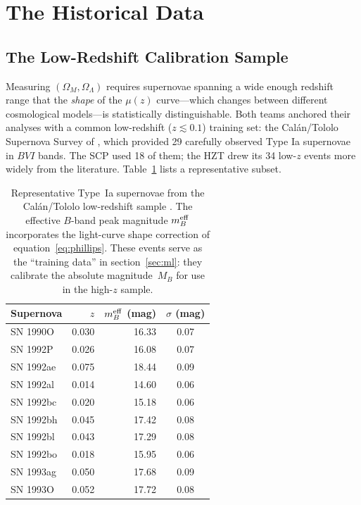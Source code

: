 \documentclass[12pt]{article}
\begin{document}
\section{The Historical Data}
\label{sec:data}

\subsection{The Low-Redshift Calibration Sample}

Measuring $(\Omega_M,\Omega_\Lambda)$ requires supernovae spanning a
wide enough redshift range that the \emph{shape} of the $\mu(z)$
curve---which changes between different cosmological models---is
statistically distinguishable.  Both teams anchored their analyses with
a common low-redshift ($z \lesssim 0.1$) training set: the
Cal\'an/Tololo Supernova Survey of \citet{Hamuy1996}, which provided 29
carefully observed Type Ia supernovae in $BVI$ bands.  The SCP used 18 of
them; the HZT drew its 34 low-$z$ events more widely from the literature.
Table~\ref{tab:calantololo} lists a representative subset.

\begin{table}[ht]
\centering
\caption{Representative Type~Ia supernovae from the Cal\'an/Tololo
low-redshift sample \citep{Hamuy1996}.  The effective $B$-band peak
magnitude $m_B^{\rm eff}$ incorporates the light-curve shape correction
of equation~\eqref{eq:phillips}.  These events serve as the
``training data'' in section~\ref{sec:ml}: they calibrate the absolute
magnitude~$M_B$ for use in the high-$z$ sample.}
\label{tab:calantololo}
\medskip
\begin{tabular}{lrrc}
\toprule
Supernova & $z$ & $m_B^{\rm eff}$ (mag) & $\sigma$ (mag) \\
\midrule
SN 1990O  & 0.030 & 16.33 & 0.07 \\
SN 1992P  & 0.026 & 16.08 & 0.07 \\
SN 1992ae & 0.075 & 18.44 & 0.09 \\
SN 1992al & 0.014 & 14.60 & 0.06 \\
SN 1992bc & 0.020 & 15.18 & 0.06 \\
SN 1992bh & 0.045 & 17.42 & 0.08 \\
SN 1992bl & 0.043 & 17.29 & 0.08 \\
SN 1992bo & 0.018 & 15.95 & 0.06 \\
SN 1993ag & 0.050 & 17.68 & 0.09 \\
SN 1993O  & 0.052 & 17.72 & 0.08 \\
\bottomrule
\end{tabular}
\end{table}
\end{document}
